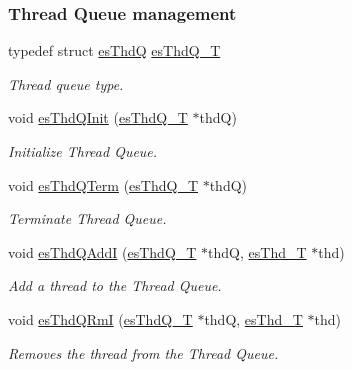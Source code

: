 \subsubsection*{Thread Queue management}
\begin{DoxyCompactItemize}
\item 
typedef struct \hyperlink{structesThdQ}{es\-Thd\-Q} \hyperlink{group__kern__intf_ga7a1a060699e83a01512ebb5540019556}{es\-Thd\-Q\-\_\-\-T}
\begin{DoxyCompactList}\small\item\em Thread queue type. \end{DoxyCompactList}\item 
void \hyperlink{group__kern__intf_gaddd5fe0557c91559b9452beb0fc236fd}{es\-Thd\-Q\-Init} (\hyperlink{group__kern__intf_ga7a1a060699e83a01512ebb5540019556}{es\-Thd\-Q\-\_\-\-T} $\ast$thd\-Q)
\begin{DoxyCompactList}\small\item\em Initialize Thread Queue. \end{DoxyCompactList}\item 
void \hyperlink{group__kern__intf_gaa5f19b32a7f0c42616b5270dcbd73a3e}{es\-Thd\-Q\-Term} (\hyperlink{group__kern__intf_ga7a1a060699e83a01512ebb5540019556}{es\-Thd\-Q\-\_\-\-T} $\ast$thd\-Q)
\begin{DoxyCompactList}\small\item\em Terminate Thread Queue. \end{DoxyCompactList}\item 
void \hyperlink{group__kern__intf_ga9da1e71c137d8adb8c9bdead7052b5fa}{es\-Thd\-Q\-Add\-I} (\hyperlink{group__kern__intf_ga7a1a060699e83a01512ebb5540019556}{es\-Thd\-Q\-\_\-\-T} $\ast$thd\-Q, \hyperlink{group__kern__intf_ga62e3a3ca0a4597a19c43cb8868810d82}{es\-Thd\-\_\-\-T} $\ast$thd)
\begin{DoxyCompactList}\small\item\em Add a thread to the Thread Queue. \end{DoxyCompactList}\item 
void \hyperlink{group__kern__intf_gaa18afa95e34035da03c5cb7ea3a96320}{es\-Thd\-Q\-Rm\-I} (\hyperlink{group__kern__intf_ga7a1a060699e83a01512ebb5540019556}{es\-Thd\-Q\-\_\-\-T} $\ast$thd\-Q, \hyperlink{group__kern__intf_ga62e3a3ca0a4597a19c43cb8868810d82}{es\-Thd\-\_\-\-T} $\ast$thd)
\begin{DoxyCompactList}\small\item\em Removes the thread from the Thread Queue. \end{DoxyCompactList}\item 

\end{DoxyCompactItemize}
